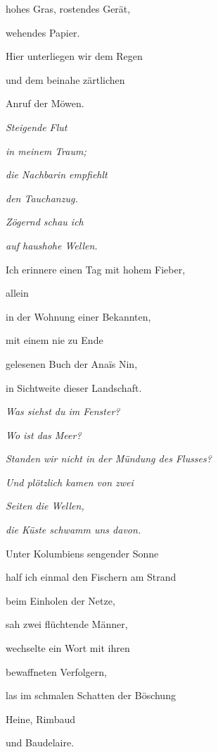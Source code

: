 hohes Gras, rostendes Gerät,

wehendes Papier.


\bigskip

Hier unterliegen wir dem Regen

und dem beinahe zärtlichen

Anruf der Möwen.


\bigskip

\emph{
Steigende Flut}

\emph{
in meinem Traum;}

\emph{
die Nachbarin empfiehlt }

\emph{
den Tauchanzug.}

\emph{
Zögernd schau ich }

\emph{
auf haushohe Wellen.}


\bigskip

Ich erinnere einen Tag mit hohem Fieber, 

allein

in der Wohnung einer Bekannten,


\bigskip

mit einem nie zu Ende

gelesenen Buch der Anaïs Nin,

in Sichtweite dieser Landschaft.


\bigskip

\emph{
Was siehst du im Fenster?}

\emph{
Wo ist das Meer?}

\emph{
Standen wir nicht in der Mündung des Flusses?}

\emph{
Und plötzlich kamen von zwei}

\emph{
Seiten die Wellen,}

\emph{
die Küste schwamm uns davon.}


\bigskip

Unter Kolumbiens sengender Sonne

half ich einmal den Fischern am Strand

beim Einholen der Netze,


\bigskip

sah zwei flüchtende Männer,

wechselte ein Wort mit ihren 

bewaffneten Verfolgern,


\bigskip

las im schmalen Schatten der Böschung

Heine, Rimbaud

und Baudelaire.


